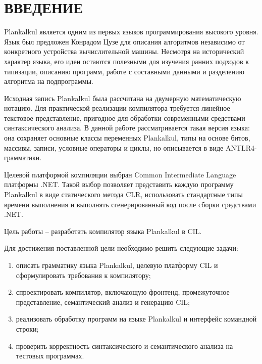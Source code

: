 \chapter*{ВВЕДЕНИЕ}

Plankalkul является одним из первых языков программирования высокого уровня.
Язык был предложен Конрадом Цузе для описания алгоритмов независимо от конкретного устройства вычислительной машины.
Несмотря на исторический характер языка, его идеи остаются полезными для изучения ранних подходов к типизации, описанию программ, работе с составными данными и разделению алгоритма на подпрограммы.

Исходная запись Plankalkul была рассчитана на двумерную математическую нотацию.
Для практической реализации компилятора требуется линейное текстовое представление, пригодное для обработки современными средствами синтаксического анализа.
В данной работе рассматривается такая версия языка: она сохраняет основные классы переменных Plankalkul, типы на основе битов, массивы, записи, условные операторы и циклы, но описывается в виде ANTLR4-грамматики.

Целевой платформой компиляции выбран Common Intermediate Language платформы .NET.
Такой выбор позволяет представить каждую программу Plankalkul в виде статического метода CLR, использовать стандартные типы времени выполнения и выполнять сгенерированный код после сборки средствами .NET.

Цель работы -- разработать компилятор языка Plankalkul в CIL.

Для достижения поставленной цели необходимо решить следующие задачи:
\begin{enumerate}
	\item описать грамматику языка Plankalkul, целевую платформу CIL и сформулировать требования к компилятору;
	\item спроектировать компилятор, включающую фронтенд, промежуточное представление, семантический анализ и генерацию CIL;
	\item реализовать обработку программ на языке Plankalkul и интерфейс командной строки;
	\item проверить корректность синтаксического и семантического анализа на тестовых программах.
\end{enumerate}
